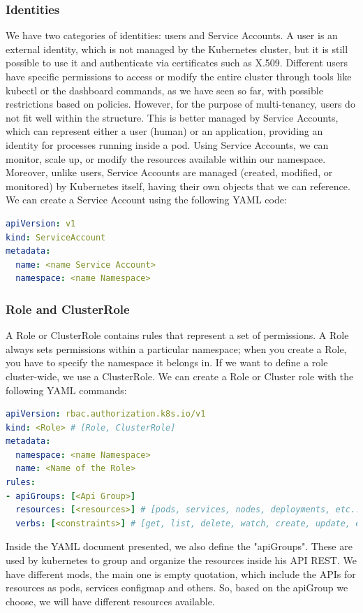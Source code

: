 \subsubsection{Identities}
We have two categories of identities: users and Service Accounts. A user is an external identity, which is not managed by the Kubernetes cluster, but it is still possible to use it and authenticate via certificates such as X.509. Different users have specific permissions to access or modify the entire cluster through tools like kubectl or the dashboard commands, as we have seen so far, with possible restrictions based on policies. However, for the purpose of multi-tenancy, users do not fit well within the structure. This is better managed by Service Accounts, which can represent either a user (human) or an application, providing an identity for processes running inside a pod. Using Service Accounts, we can monitor, scale up, or modify the resources available within our namespace. Moreover, unlike users, Service Accounts are managed (created, modified, or monitored) by Kubernetes itself, having their own objects that we can reference. We can create a Service Account using the following YAML code:
\begin{lstlisting}[language=yaml, caption={Service Account creation}, label={lst:service_account_creation}]
apiVersion: v1
kind: ServiceAccount
metadata:
  name: <name Service Account>
  namespace: <name Namespace>
\end{lstlisting}
\subsubsection{Role and ClusterRole}
A Role or ClusterRole contains rules that represent a set of permissions. A Role always sets permissions within a particular namespace; when you create a Role, you have to specify the namespace it belongs in. If we want to define a role cluster-wide, we use a ClusterRole. We can create a Role or Cluster role with the following YAML commands:
\begin{lstlisting}[language=yaml, caption={Role or Cluster Role creation}, label={lst:service_account_creation}]
apiVersion: rbac.authorization.k8s.io/v1
kind: <Role> # [Role, ClusterRole]
metadata:
  namespace: <name Namespace>
  name: <Name of the Role>
rules:
- apiGroups: [<Api Group>]
  resources: [<resources>] # [pods, services, nodes, deployments, etc..]
  verbs: [<constraints>] # [get, list, delete, watch, create, update, etc..]
\end{lstlisting}
Inside the YAML document presented, we also define the "apiGroups". These are used by kubernetes to group and organize the resources inside his API REST. We have different mods, the main one is empty quotation, which include the APIs for resources as pods, services configmap and others. So, based on the apiGroup we choose, we will have different resources available.
